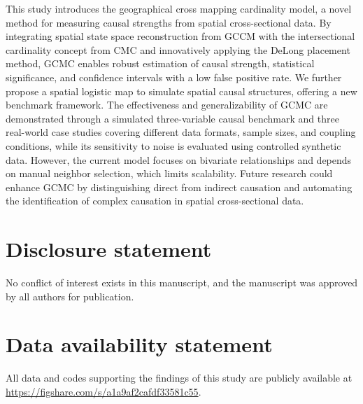 \documentclass[authoryear,preprint,review,12pt]{elsarticle}
\begin{document}
This study introduces the geographical cross mapping cardinality model, a novel method for measuring causal strengths from spatial cross-sectional data. By integrating spatial state space reconstruction from GCCM with the intersectional cardinality concept from CMC and innovatively applying the DeLong placement method, GCMC enables robust estimation of causal strength, statistical significance, and confidence intervals with a low false positive rate. We further propose a spatial logistic map to simulate spatial causal structures, offering a new benchmark framework. The effectiveness and generalizability of GCMC are demonstrated through a simulated three-variable causal benchmark and three real-world case studies covering different data formats, sample sizes, and coupling conditions, while its sensitivity to noise is evaluated using controlled synthetic data. However, the current model focuses on bivariate relationships and depends on manual neighbor selection, which limits scalability. Future research could enhance GCMC by distinguishing direct from indirect causation and automating the identification of complex causation in spatial cross-sectional data.

\section*{Disclosure statement}

No conflict of interest exists in this manuscript, and the manuscript was approved by all authors for publication.

\section*{Data availability statement}

All data and codes supporting the findings of this study are publicly available at \\
\url{https://figshare.com/s/a1a9af2cafdf33581c55}. 


\end{document}
